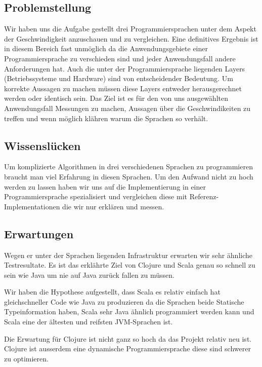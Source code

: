 \documentclass{fancydocument}
\begin{document}
\subsection{Problemstellung}

Wir haben uns die Aufgabe gestellt drei Programmiersprachen unter dem
Aspekt der Geschwindigkeit anzuschauen und zu vergleichen. Eine
definitives Ergebnis ist in diesem Bereich fast unmöglich da die
Anwendungsgebiete einer Programmiersprache zu verschieden sind und
jeder Anwendungsfall andere Anforderungen hat. Auch die
unter der Programmiersprache liegenden Layers (Betriebssysteme und
Hardware) sind von entscheidender Bedeutung. Um korrekte Aussagen zu
machen m\"ussen diese Layers entweder herausgerechnet werden oder
identisch sein. Das Ziel ist es f\"ur den von uns ausgew\"ahlten Anwendungsfall Messungen
zu machen, Aussagen \"uber die Geschwindikeiten zu treffen und
wenn m\"oglich kl\"ahren warum die Sprachen so verh\"alt.

\subsection{Wissenslücken}

Um komplizierte Algorithmen in drei verschiedenen Sprachen zu
programmieren braucht man viel Erfahrung in diesen Sprachen. Um den
Aufwand nicht zu hoch werden zu lassen haben wir uns auf die
Implementierung in einer Programmiersprache spezialisiert und
vergleichen diese mit Referenz-Implementationen die wir nur erklären
und messen.

\subsection{Erwartungen}

Wegen er unter der Sprachen liegenden Infrastruktur erwarten wir sehr
\"ahnliche Testresultate. Es ist das erkl\"ahrte Ziel von Clojure und
Scala genau so schnell zu sein wie Java um nie auf Java zur\"uck fallen
zu m\"ussen. 

Wir haben die Hypothese aufgestellt, dass Scala es relativ einfach hat
gleichschneller Code wie Java zu produzieren da die Sprachen beide 
Statische Typeinformation haben, Scala sehr Java \"ahnlich programmiert werden kann
und Scala eine der \"altesten und reifsten JVM-Sprachen ist.

Die Erwartung f\"ur Clojure ist nicht ganz so hoch da das Projekt relativ neu ist. Clojure 
ist ausserdem eine dynamische Programmiersprache diese sind schwerer zu optimieren.
\end{document}
